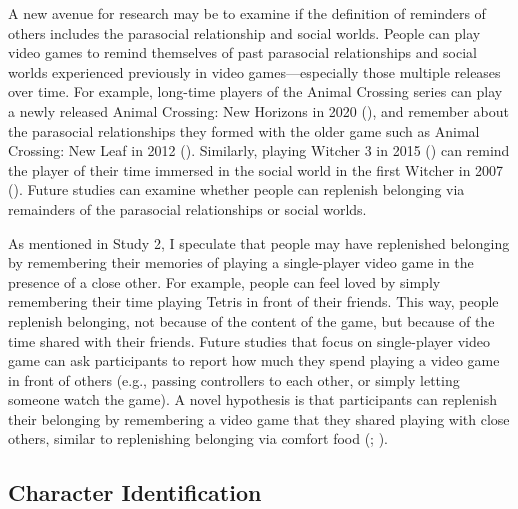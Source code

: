 \documentclass[
]{udthesis}
\begin{document}
A new avenue for research may be to examine if the definition of
reminders of others includes the parasocial relationship and social
worlds. People can play video games to remind themselves of past
parasocial relationships and social worlds experienced previously in
video games---especially those multiple releases over time. For example,
long-time players of the Animal Crossing series can play a newly
released Animal Crossing: New Horizons in 2020 (), and
remember about the parasocial relationships they formed with the older
game such as Animal Crossing: New Leaf in 2012 ().
Similarly, playing Witcher 3 in 2015 () can remind the
player of their time immersed in the social world in the first Witcher
in 2007 (). Future studies can examine whether people
can replenish belonging via remainders of the parasocial relationships
or social worlds.

As mentioned in Study 2, I speculate that people may have replenished
belonging by remembering their memories of playing a single-player video
game in the presence of a close other. For example, people can feel
loved by simply remembering their time playing Tetris in front of their
friends. This way, people replenish belonging, not because of the
content of the game, but because of the time shared with their friends.
Future studies that focus on single-player video game can ask
participants to report how much they spend playing a video game in front
of others (e.g., passing controllers to each other, or simply letting
someone watch the game). A novel hypothesis is that participants can
replenish their belonging by remembering a video game that they shared
playing with close others, similar to replenishing belonging via comfort
food (; ).

\subsection{Character Identification}\label{character-identification}
\end{document}
